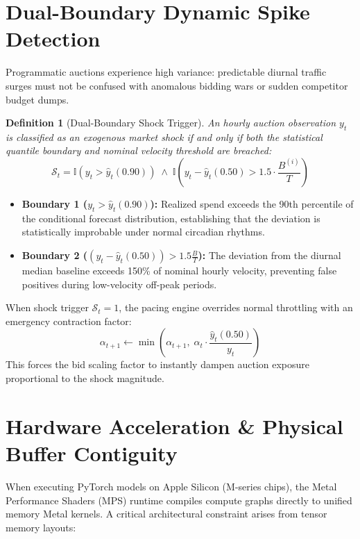 \documentclass[11pt,a4paper]{article}
\newtheorem{definition}[theorem]{Definition}
\begin{document}
\section{Dual-Boundary Dynamic Spike Detection}

Programmatic auctions experience high variance: predictable diurnal traffic surges must not be confused with anomalous bidding wars or sudden competitor budget dumps.

\begin{definition}[Dual-Boundary Shock Trigger]
An hourly auction observation $y_t$ is classified as an exogenous market shock if and only if both the statistical quantile boundary and nominal velocity threshold are breached:
\begin{equation}
    \mathcal{S}_t = \mathbb{I}\left( y_t > \hat{y}_t(0.90) \right) \;\land\; \mathbb{I}\left( y_t - \hat{y}_t(0.50) > 1.5 \cdot \frac{B^{(i)}}{T} \right)
\end{equation}
\end{definition}

\begin{itemize}
    \item \textbf{Boundary 1 ($y_t > \hat{y}_t(0.90)$):} Realized spend exceeds the 90th percentile of the conditional forecast distribution, establishing that the deviation is statistically improbable under normal circadian rhythms.
    \item \textbf{Boundary 2 ($(y_t - \hat{y}_t(0.50)) > 1.5 \frac{B}{T}$):} The deviation from the diurnal median baseline exceeds 150\% of nominal hourly velocity, preventing false positives during low-velocity off-peak periods.
\end{itemize}

When shock trigger $\mathcal{S}_t = 1$, the pacing engine overrides normal throttling with an emergency contraction factor:
\begin{equation}
    \alpha_{t+1} \leftarrow \min\left(\alpha_{t+1}, \; \alpha_t \cdot \frac{\hat{y}_t(0.50)}{y_t}\right)
\end{equation}
This forces the bid scaling factor to instantly dampen auction exposure proportional to the shock magnitude.

\section{Hardware Acceleration \& Physical Buffer Contiguity}

When executing PyTorch models on Apple Silicon (M-series chips), the Metal Performance Shaders (MPS) runtime compiles compute graphs directly to unified memory Metal kernels. A critical architectural constraint arises from tensor memory layouts:
\end{document}
